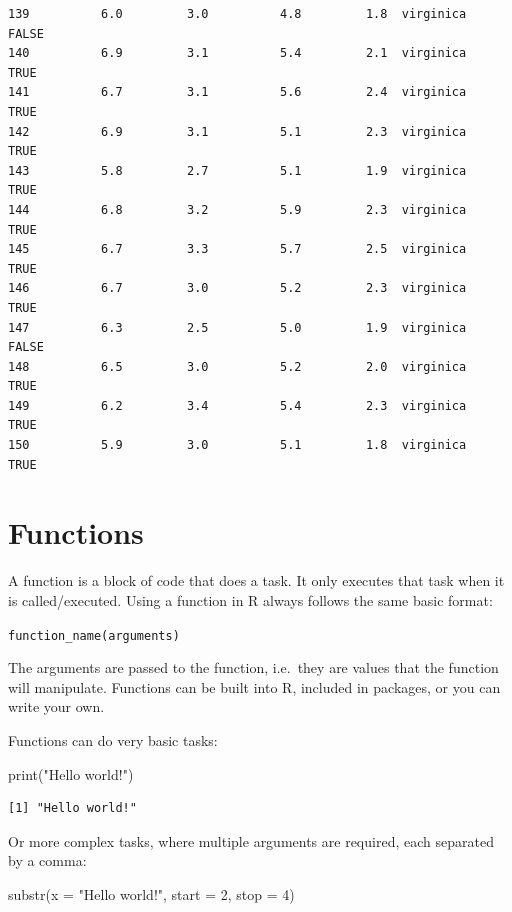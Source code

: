 \documentclass[
  letterpaper,
  DIV=11,
  numbers=noendperiod]{scrreprt}
\newenvironment{Shaded}{\begin{snugshade}}{\end{snugshade}}
\newcommand{\AttributeTok}[1]{\textcolor[rgb]{0.40,0.45,0.13}{#1}}
\newcommand{\DecValTok}[1]{\textcolor[rgb]{0.68,0.00,0.00}{#1}}
\newcommand{\FunctionTok}[1]{\textcolor[rgb]{0.28,0.35,0.67}{#1}}
\newcommand{\NormalTok}[1]{\textcolor[rgb]{0.00,0.23,0.31}{#1}}
\newcommand{\StringTok}[1]{\textcolor[rgb]{0.13,0.47,0.30}{#1}}
\begin{document}
\begin{verbatim}
139          6.0         3.0          4.8         1.8  virginica     FALSE
140          6.9         3.1          5.4         2.1  virginica      TRUE
141          6.7         3.1          5.6         2.4  virginica      TRUE
142          6.9         3.1          5.1         2.3  virginica      TRUE
143          5.8         2.7          5.1         1.9  virginica      TRUE
144          6.8         3.2          5.9         2.3  virginica      TRUE
145          6.7         3.3          5.7         2.5  virginica      TRUE
146          6.7         3.0          5.2         2.3  virginica      TRUE
147          6.3         2.5          5.0         1.9  virginica     FALSE
148          6.5         3.0          5.2         2.0  virginica      TRUE
149          6.2         3.4          5.4         2.3  virginica      TRUE
150          5.9         3.0          5.1         1.8  virginica      TRUE
\end{verbatim}

\section{Functions}\label{functions}

A function is a block of code that does a task. It only executes that
task when it is called/executed. Using a function in R always follows
the same basic format:

\texttt{function\_name(arguments)}

The arguments are passed to the function, i.e.~they are values that the
function will manipulate. Functions can be built into R, included in
packages, or you can write your own.

Functions can do very basic tasks:

\begin{Shaded}
\begin{Highlighting}[]
\FunctionTok{print}\NormalTok{(}\StringTok{"Hello world!"}\NormalTok{)}
\end{Highlighting}
\end{Shaded}

\begin{verbatim}
[1] "Hello world!"
\end{verbatim}

Or more complex tasks, where multiple arguments are required, each
separated by a comma:

\begin{Shaded}
\begin{Highlighting}[]
\FunctionTok{substr}\NormalTok{(}\AttributeTok{x =} \StringTok{"Hello world!"}\NormalTok{, }\AttributeTok{start =} \DecValTok{2}\NormalTok{, }\AttributeTok{stop =} \DecValTok{4}\NormalTok{)}
\end{Highlighting}
\end{Shaded}
\end{document}
